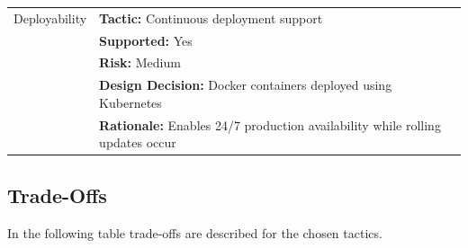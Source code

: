 \documentclass[conference]{IEEEtran}
\begin{document}
\begin{table}[h]
{\begin{tabular}{|l|p{7.5cm}|}
Deployability &
\textbf{Tactic:} Continuous deployment support \\
& \textbf{Supported:} Yes \\
& \textbf{Risk:} Medium \\
& \textbf{Design Decision:} Docker containers deployed using Kubernetes \\
& \textbf{Rationale:} Enables 24/7 production availability while rolling updates occur \\ \hline

\end{tabular}
}

\label{tab:tactics_ieee}
\end{table}

\subsection{Trade-Offs}

In the following table trade-offs are described for the chosen tactics.
\end{document}
